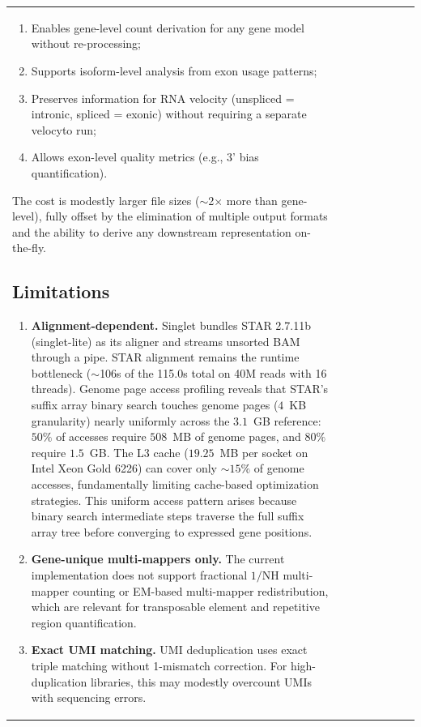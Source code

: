 \documentclass[11pt,a4paper]{article}
\begin{document}
\begin{table}[t]
\begin{tabular}{llllrrrr}
{\begin{enumerate}
    \item Enables gene-level count derivation for any gene model without re-processing;
    \item Supports isoform-level analysis from exon usage patterns;
    \item Preserves information for RNA velocity (unspliced = intronic, spliced = exonic) without requiring a separate velocyto run;
    \item Allows exon-level quality metrics (e.g., 3' bias quantification).
\end{enumerate}

The cost is modestly larger file sizes ($\sim$2$\times$ more than gene-level), fully offset by the elimination of multiple output formats and the ability to derive any downstream representation on-the-fly.

\subsection{Limitations}

\begin{enumerate}
    \item \textbf{Alignment-dependent.} Singlet bundles STAR 2.7.11b (singlet-lite) as its aligner and streams unsorted BAM through a pipe. STAR alignment remains the runtime bottleneck ($\sim$106s of the 115.0s total on 40M reads with 16 threads). Genome page access profiling reveals that STAR's suffix array binary search touches genome pages ($4$~KB granularity) nearly uniformly across the $3.1$~GB reference: $50\%$ of accesses require $508$~MB of genome pages, and $80\%$ require $1.5$~GB. The L3 cache ($19.25$~MB per socket on Intel Xeon Gold 6226) can cover only $\sim\!15\%$ of genome accesses, fundamentally limiting cache-based optimization strategies. This uniform access pattern arises because binary search intermediate steps traverse the full suffix array tree before converging to expressed gene positions.
    
    \item \textbf{Gene-unique multi-mappers only.} The current implementation does not support fractional $1/\text{NH}$ multi-mapper counting or EM-based multi-mapper redistribution, which are relevant for transposable element and repetitive region quantification.
    
    \item \textbf{Exact UMI matching.} UMI deduplication uses exact triple matching without 1-mismatch correction. For high-duplication libraries, this may modestly overcount UMIs with sequencing errors.
    

\end{enumerate}}
\end{tabular}
\end{table}
\end{document}
